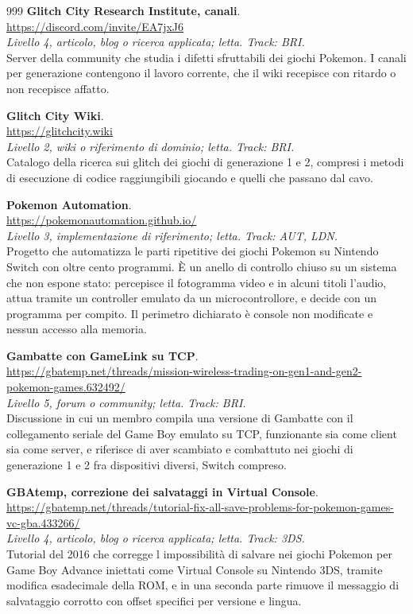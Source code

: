 \begin{thebibliography}{999}
  \textbf{Glitch City Research Institute, canali}.
  \\ \url{https://discord.com/invite/EA7jxJ6}
  \\ \emph{Livello 4, articolo, blog o ricerca applicata; letta. Track: BRI.}
  \\ Server della community che studia i difetti sfruttabili dei giochi Pokemon. I canali per generazione contengono il lavoro corrente, che il wiki recepisce con ritardo o non recepisce affatto.

  \textbf{Glitch City Wiki}.
  \\ \url{https://glitchcity.wiki}
  \\ \emph{Livello 2, wiki o riferimento di dominio; letta. Track: BRI.}
  \\ Catalogo della ricerca sui glitch dei giochi di generazione 1 e 2, compresi i metodi di esecuzione di codice raggiungibili giocando e quelli che passano dal cavo.

  \textbf{Pokemon Automation}.
  \\ \url{https://pokemonautomation.github.io/}
  \\ \emph{Livello 3, implementazione di riferimento; letta. Track: AUT, LDN.}
  \\ Progetto che automatizza le parti ripetitive dei giochi Pokemon su Nintendo Switch con oltre cento programmi. È un anello di controllo chiuso su un sistema che non espone stato: percepisce il fotogramma video e in alcuni titoli l'audio, attua tramite un controller emulato da un microcontrollore, e decide con un programma per compito. Il perimetro dichiarato è console non modificate e nessun accesso alla memoria.

  \textbf{Gambatte con GameLink su TCP}.
  \\ \url{https://gbatemp.net/threads/mission-wireless-trading-on-gen1-and-gen2-pokemon-games.632492/}
  \\ \emph{Livello 5, forum o community; letta. Track: BRI.}
  \\ Discussione in cui un membro compila una versione di Gambatte con il collegamento seriale del Game Boy emulato su TCP, funzionante sia come client sia come server, e riferisce di aver scambiato e combattuto nei giochi di generazione 1 e 2 fra dispositivi diversi, Switch compreso.

  \textbf{GBAtemp, correzione dei salvataggi in Virtual Console}.
  \\ \url{https://gbatemp.net/threads/tutorial-fix-all-save-problems-for-pokemon-games-vc-gba.433266/}
  \\ \emph{Livello 4, articolo, blog o ricerca applicata; letta. Track: 3DS.}
  \\ Tutorial del 2016 che corregge l impossibilità di salvare nei giochi Pokemon per Game Boy Advance iniettati come Virtual Console su Nintendo 3DS, tramite modifica esadecimale della ROM, e in una seconda parte rimuove il messaggio di salvataggio corrotto con offset specifici per versione e lingua.


\end{thebibliography}
